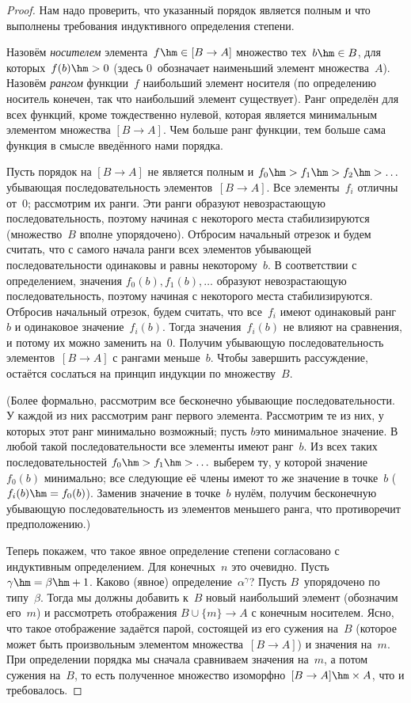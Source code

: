 \begin{proof}
Нам надо проверить, что указанный порядок является
полным и что выполнены требования индуктивного определения
степени.

Назовём \emph{носителем}
элемента~$f\hm\in[B\to A]$ множество
тех~$b\hm\in B$, для которых~$f(b)\hm>0$ (здесь $0$~обозначает
наименьший элемент множества~$A$). Назовём \emph{рангом}
функции~$f$ наибольший элемент носителя (по определению носитель
конечен, так что наибольший элемент существует). Ранг определён
для всех функций, кроме тождественно нулевой, которая является
минимальным элементом множества $[B\to A]$. Чем больше ранг
функции, тем больше сама функция в смысле введённого нами
порядка.

Пусть порядок на $[B\to A]$ не является полным и
$f_0\hm>f_1\hm>f_2\hm>\ldots$\т убывающая последовательность
элементов~$[B\to A]$. Все элементы~$f_i$ отличны от~$0$;
рассмотрим их ранги. Эти ранги образуют невозрастающую
последовательность, поэтому начиная с некоторого места
стабилизируются (множество~$B$ вполне упорядочено). Отбросим
начальный отрезок и будем считать, что с самого начала ранги
всех элементов убывающей последовательности одинаковы и равны
некоторому~$b$. В соответствии с определением, значения $f_0(b),
f_1(b),\dots$ образуют невозрастающую последовательность,
поэтому начиная с некоторого места стабилизируются. Отбросив
начальный отрезок, будем считать, что все~$f_i$ имеют одинаковый
ранг~$b$ и одинаковое значение~$f_i(b)$. Тогда значения~$f_i(b)$
не влияют на сравнения, и потому их можно заменить на~$0$.
Получим убывающую последовательность элементов~$[B\to A]$ с
рангами меньше~$b$. Чтобы завершить рассуждение, остаётся
сослаться на принцип индукции по множеству~$B$.

(Более формально, рассмотрим все бесконечно убывающие
последовательности. У каждой из них рассмотрим ранг первого
элемента. Рассмотрим те из них, у которых этот ранг минимально
возможный; пусть $b$\т это минимальное значение. В любой такой
последовательности все элементы имеют ранг~$b$. Из всех таких
последовательностей $f_0\hm>f_1\hm>\ldots$ выберем ту, у которой
значение~$f_0(b)$ минимально; все следующие её члены имеют то же
значение в точке~$b$ (~$f_i(b)\hm=f_0(b)$). Заменив значение в
точке~$b$ нулём, получим бесконечную убывающую
последовательность из элементов меньшего ранга, что противоречит
предположению.)

Теперь покажем, что такое явное определение степени согласовано
с индуктивным определением. Для конечных~$n$ это очевидно.
Пусть~$\gamma\hm=\beta\hm+1$. Каково (явное) определение~$\alpha^\gamma$?
Пусть $B$~упорядочено по типу~$\beta$. Тогда мы должны добавить
к~$B$ новый наибольший элемент (обозначим его~$m$) и
рассмотреть отображения $B\cup\{m\}\to A$ с конечным носителем.
Ясно, что такое отображение задаётся парой, состоящей из его
сужения на~$B$ (которое может быть произвольным элементом
множества~$[B\to A]$) и значения на~$m$. При определении порядка
мы сначала сравниваем значения на~$m$, а потом сужения на~$B$,
то есть полученное множество изоморфно~$[B\to A]\hm\times A$, что
и требовалось.


\end{proof}
